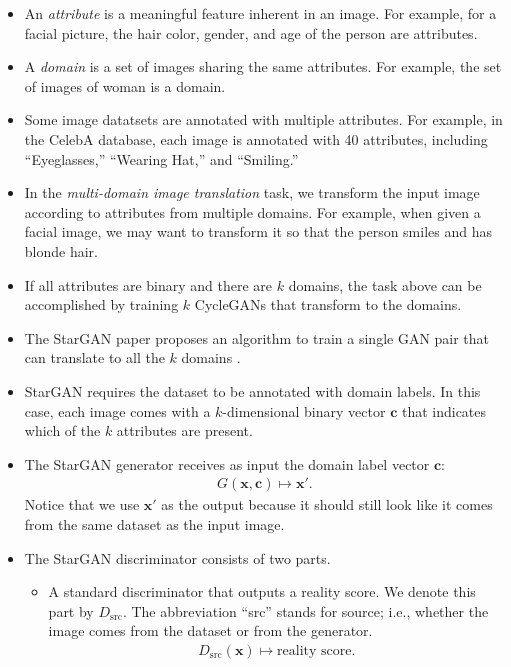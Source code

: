 \documentclass[10pt]{article}
\newcommand{\ve}[1]{\pmb{#1}}
\newcommand{\mrm}[1]{\mathrm{#1}}
\begin{document}
  \begin{itemize}
    \item An \emph{attribute} is a meaningful feature inherent in an image. For example, for a facial picture, the hair color, gender, and age of the person are attributes.

    \item A \emph{domain} is a set of images sharing the same attributes. For example, the set of images of woman is a domain.

    \item Some image datatsets are annotated with multiple attributes. For example, in the CelebA database, each image is annotated with 40 attributes, including ``Eyeglasses,'' ``Wearing Hat,'' and ``Smiling.''

    \item In the \emph{multi-domain image translation} task, we transform the input image according to attributes from multiple domains. For example, when given a facial image, we may want to transform it so that the person smiles and has blonde hair.    

    \item If all attributes are binary and there are $k$ domains, the task above can be accomplished by training $k$ CycleGANs that transform to the domains.

    \item The StarGAN paper proposes an algorithm to train a single GAN pair that can translate to all the $k$ domains \cite{Choi:2017}.

    \item StarGAN requires the dataset to be annotated with domain labels. In this case, each image comes with a $k$-dimensional binary vector $\ve{c}$ that indicates which of the $k$ attributes are present.

    \item The StarGAN generator receives as input the domain label vector $\ve{c}$:
    \begin{align*}
      G(\ve{x}, \ve{c}) \mapsto \ve{x}'.      
    \end{align*}
    Notice that we use $\ve{x}'$ as the output because it should still look like it comes from the same dataset as the input image.

    \item The StarGAN discriminator consists of two parts.
    \begin{itemize}
      \item  A standard discriminator that outputs a reality score. We denote this part by $D_{\mrm{src}}$. The abbreviation ``src'' stands for source; i.e., whether the image comes from the dataset or from the generator.
      \begin{align*}
        D_{\mrm{src}}(\ve{x}) \mapsto \mbox{reality score}.
      \end{align*}


\end{itemize}
\end{itemize}
\end{document}
